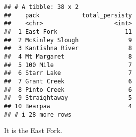 \documentclass[
]{article}
\begin{document}
\begin{verbatim}
## # A tibble: 38 x 2
##    pack            total_persisty
##    <chr>                    <int>
##  1 East Fork                   11
##  2 McKinley Slough              9
##  3 Kantishna River              8
##  4 Mt Margaret                  8
##  5 100 Mile                     7
##  6 Starr Lake                   7
##  7 Grant Creek                  6
##  8 Pinto Creek                  6
##  9 Straightaway                 5
## 10 Bearpaw                      4
## # i 28 more rows
\end{verbatim}

It is the East Fork.
\end{document}
